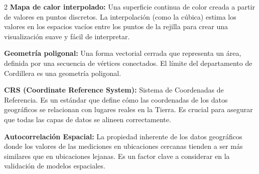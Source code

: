 \documentclass[a4paper,10pt]{article}
\begin{document}
\begin{multicols}{2}
\textbf{Mapa de calor interpolado:} Una superficie continua de color creada a partir de valores en puntos discretos. La interpolación (como la cúbica) estima los valores en los espacios vacíos entre los puntos de la rejilla para crear una visualización suave y fácil de interpretar.

\textbf{Geometría poligonal:} Una forma vectorial cerrada que representa un área, definida por una secuencia de vértices conectados. El límite del departamento de Cordillera es una geometría poligonal.

\textbf{CRS (Coordinate Reference System):} Sistema de Coordenadas de Referencia. Es un estándar que define cómo las coordenadas de los datos geográficos se relacionan con lugares reales en la Tierra. Es crucial para asegurar que todas las capas de datos se alineen correctamente.

\textbf{Autocorrelación Espacial:} La propiedad inherente de los datos geográficos donde los valores de las mediciones en ubicaciones cercanas tienden a ser más similares que en ubicaciones lejanas. Es un factor clave a considerar en la validación de modelos espaciales.








\end{multicols}
\end{document}
